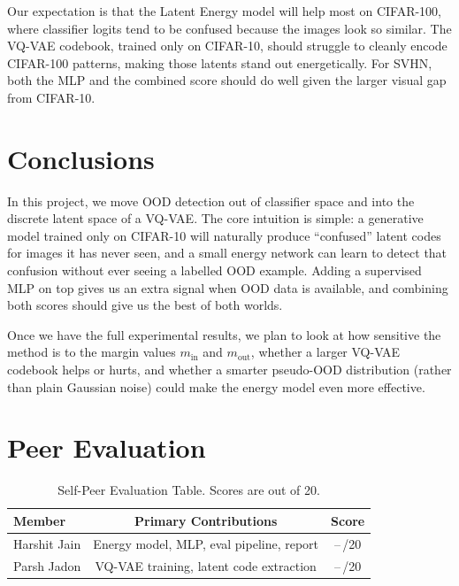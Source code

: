 \documentclass[10pt,twocolumn,letterpaper]{article}
\begin{document}
Our expectation is that the Latent Energy model will help most on
CIFAR-100, where classifier logits tend to be confused because the
images look so similar. The VQ-VAE codebook, trained only on CIFAR-10,
should struggle to cleanly encode CIFAR-100 patterns, making those
latents stand out energetically. For SVHN, both the MLP and the
combined score should do well given the larger visual gap from CIFAR-10.

\section{Conclusions}

In this project, we move OOD detection out of classifier space and into
the discrete latent space of a VQ-VAE. The core intuition is simple: a
generative model trained only on CIFAR-10 will naturally produce
``confused'' latent codes for images it has never seen, and a small
energy network can learn to detect that confusion without ever seeing
a labelled OOD example. Adding a supervised MLP on top gives us an
extra signal when OOD data is available, and combining both scores
should give us the best of both worlds.

Once we have the full experimental results, we plan to look at how
sensitive the method is to the margin values $m_{\mathrm{in}}$ and
$m_{\mathrm{out}}$, whether a larger VQ-VAE codebook helps or hurts,
and whether a smarter pseudo-OOD distribution (rather than plain
Gaussian noise) could make the energy model even more effective.

\section*{Peer Evaluation}

\begin{table}[h]
  \centering
  \caption{Self-Peer Evaluation Table. Scores are out of 20.}
  \label{tab:peer}
  \small
  \begin{tabular}{lcc}
    \toprule
    Member & Primary Contributions & Score \\
    \midrule
    Harshit Jain  & Energy model, MLP, eval pipeline, report & --\,/20 \\
    Parsh Jadon   & VQ-VAE training, latent code extraction  & --\,/20 \\
    \bottomrule
  \end{tabular}
\end{table}
\end{document}
